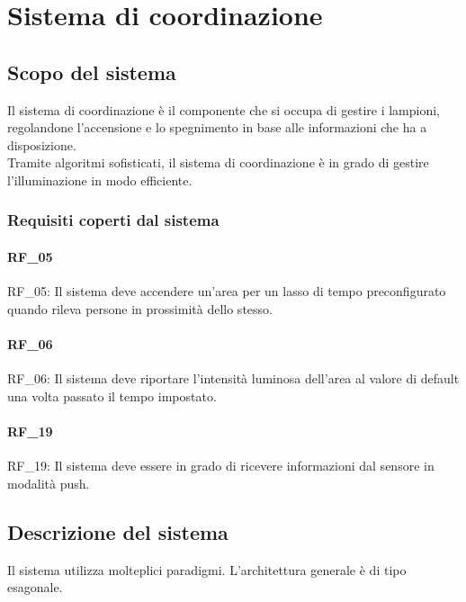 \chapter{Sistema di coordinazione}\label{cap:sistema-coordinazione}

\section{Scopo del sistema}
Il sistema di coordinazione è il componente che si occupa di gestire i lampioni, regolandone l'accensione e lo spegnimento in base alle informazioni che ha a disposizione.\\

Tramite algoritmi sofisticati, il sistema di coordinazione è in grado di gestire l'illuminazione in modo efficiente.

\subsection{Requisiti coperti dal sistema}

\subsubsection{RF\_05}

RF\_05: Il sistema deve accendere un'area per un lasso di tempo preconfigurato quando rileva persone in prossimità dello stesso.

\subsubsection{RF\_06}

RF\_06: Il sistema deve riportare l'intensità luminosa dell'area al valore di default una volta passato il tempo impostato.

\subsubsection{RF\_19}

RF\_19: Il sistema deve essere in grado di ricevere informazioni dal sensore in modalità push.

\section{Descrizione del sistema}

Il sistema utilizza molteplici paradigmi. L'architettura generale è di tipo esagonale.

